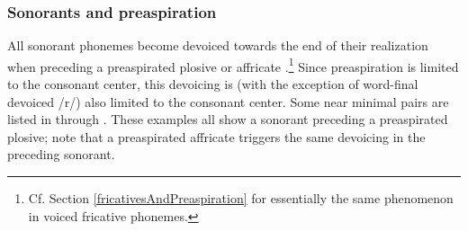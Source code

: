 \subsubsection{Sonorants and preaspiration}\label{sonorantsAndPreaspiration}
All sonorant phonemes become devoiced towards the end of their realization when preceding a preaspirated plosive or affricate%
.\footnote{Cf. Section \ref{fricativesAndPreaspiration} for essentially the same phenomenon in voiced fricative phonemes.} 
Since preaspiration is limited to the consonant center, this devoicing is (with the exception of word-final devoiced /r/) also limited to the consonant center. Some near minimal pairs are listed in  through . 
These examples all show a sonorant preceding a preaspirated plosive; note that a preaspirated affricate triggers the same devoicing in the preceding sonorant. 




